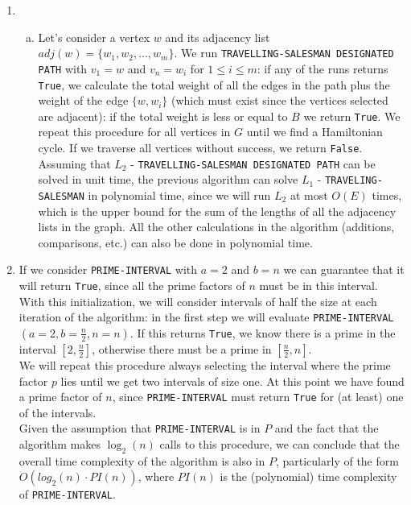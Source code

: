 \documentclass{article}
\begin{document}
\begin{enumerate}[1.]
    \item 
    \begin{enumerate}[(a)]
        \item Let's consider a vertex $w$ and its adjacency list $adj(w) = \{w_1, w_2, \ldots, w_m\}$. We run \texttt{TRAVELLING-SALESMAN DESIGNATED PATH} with $v_1 = w$ and $v_n = w_i$ for $1 \leq i \leq m$: if any of the runs returns \texttt{True}, we calculate the total weight of all the edges in the path plus the weight of the edge $\{w, w_i\}$ (which must exist since the vertices selected are adjacent): if the total weight is less or equal to $B$ we return \texttt{True}. We repeat this procedure for all vertices in $G$ until we find a Hamiltonian cycle. If we traverse all vertices without success, we return \texttt{False}.\\
        Assuming that $L_2$ - \texttt{TRAVELLING-SALESMAN DESIGNATED PATH} can be solved in unit time, the previous algorithm can solve $L_1$ - \texttt{TRAVELING-SALESMAN} in polynomial time, since we will run $L_2$ at most $O(E)$ times, which is the upper bound for the sum of the lengths of all the adjacency lists in the graph. All the other calculations in the algorithm (additions, comparisons, etc.) can also be done in polynomial time.
    \end{enumerate}
    
    \item If we consider \texttt{PRIME-INTERVAL} with $a = 2$ and $b = n$ we can guarantee that it will return \texttt{True}, since all the prime factors of $n$ must be in this interval. With this initialization, we will consider intervals of half the size at each iteration of the algorithm: in the first step we will evaluate \texttt{PRIME-INTERVAL}$(a = 2, b = \frac{n}{2}, n = n)$. If this returns \texttt{True}, we know there is a prime in the interval $[2, \frac{n}{2}]$, otherwise there must be a prime in $[\frac{n}{2}, n]$.\\
    We will repeat this procedure always selecting the interval where the prime factor $p$ lies until we get two intervals of size one. At this point we have found a prime factor of $n$, since \texttt{PRIME-INTERVAL} must return \texttt{True} for (at least) one of the intervals.\\
    Given the assumption that \texttt{PRIME-INTERVAL} is in $P$ and the fact that the algorithm makes $\log_2(n)$ calls to this procedure, we can conclude that the overall time complexity of the algorithm is also in $P$, particularly of the form $O(log_2(n) \cdot PI(n))$, where $PI(n)$ is the (polynomial) time complexity of \texttt{PRIME-INTERVAL}.
    

\end{enumerate}
\end{document}
